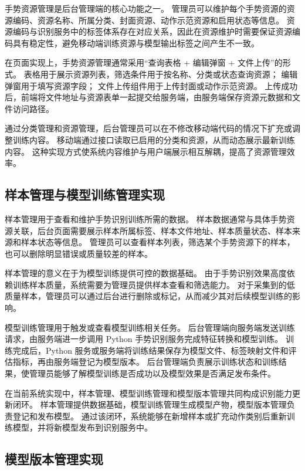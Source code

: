 手势资源管理是后台管理端的核心功能之一。
管理员可以维护每个手势资源的资源编码、资源名称、所属分类、封面资源、动作示范资源和启用状态等信息。
资源编码与识别服务中的标签体系存在对应关系，因此在资源维护时需要保证资源编码具有稳定性，避免移动端训练资源与模型输出标签之间产生不一致。

在页面实现上，手势资源管理通常采用“查询表格 + 编辑弹窗 + 文件上传”的形式。
表格用于展示资源列表，筛选条件用于按名称、分类或状态查询资源；
编辑弹窗用于填写资源字段；
文件上传组件用于上传封面或动作示范资源。
上传成功后，前端将文件地址与资源表单一起提交给服务端，由服务端保存资源元数据和文件访问路径。

通过分类管理和资源管理，后台管理员可以在不修改移动端代码的情况下扩充或调整训练内容。
移动端通过接口读取已启用的分类和资源，从而动态展示最新训练内容。
这种实现方式使系统内容维护与用户端展示相互解耦，提高了资源管理效率。

\subsection{样本管理与模型训练管理实现}

样本管理用于查看和维护手势识别训练所需的数据。
样本数据通常与具体手势资源关联，后台页面需要展示样本所属标签、样本文件地址、样本质量状态、样本来源和样本状态等信息。
管理员可以查看样本列表，筛选某个手势资源下的样本，也可以删除明显错误或质量较差的样本。

样本管理的意义在于为模型训练提供可控的数据基础。
由于手势识别效果高度依赖训练样本质量，系统需要为管理员提供样本查看和筛选能力。
对于采集到的低质量样本，管理员可以通过后台进行删除或标记，从而减少其对后续模型训练的影响。

模型训练管理用于触发或查看模型训练相关任务。
后台管理端向服务端发送训练请求，由服务端进一步调用 Python 手势识别服务完成特征转换和模型训练。
训练完成后，Python 服务或服务端将训练结果保存为模型文件、标签映射文件和评估指标，再由服务端登记为模型版本。
后台管理端负责展示训练状态和训练结果，使管理员能够了解模型训练是否成功以及模型效果是否满足发布条件。

在当前系统实现中，样本管理、模型训练管理和模型版本管理共同构成识别能力更新闭环。
样本管理提供数据基础，模型训练管理生成模型产物，模型版本管理负责登记和发布模型。
通过该闭环，系统能够在新增样本或扩充动作类别后重新训练模型，并将新模型发布到识别服务中。

\subsection{模型版本管理实现}

